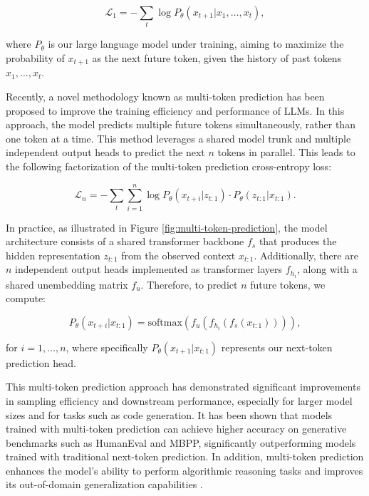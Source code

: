 \begin{equation}
    \mathcal{L}_1 = - \sum_{t} \log P_\theta (x_{t+1} | x_1, \ldots, x_t),
\end{equation}

where \( P_\theta \) is our large language model under training, aiming to maximize the probability of \( {x_{t+1}} \) as the next future token, given the history of past tokens \( {x_1, \ldots, x_t} \).

Recently, a novel methodology known as multi-token prediction has been proposed to improve the training efficiency and performance of LLMs. In this approach, the model predicts multiple future tokens simultaneously, rather than one token at a time. This method leverages a shared model trunk and multiple independent output heads to predict the next \( n \) tokens in parallel. This leads to the following factorization of the multi-token prediction cross-entropy
loss:

\begin{equation}
    \mathcal{L}_n = - \sum_{t} \sum_{i=1}^{n} \log P_\theta (x_{t+i} | z_{t:1}) \cdot P_\theta(z_{t:1} | x_{t:1}).
\end{equation}

In practice, as illustrated in Figure \ref{fig:multi-token-prediction}, the model architecture consists of a shared transformer backbone \( f_s \) that produces the hidden representation \( z_{t:1} \) from the observed context \( x_{t:1} \). Additionally, there are \( n \) independent output heads implemented as transformer layers \( f_{h_i} \), along with a shared unembedding matrix \( f_u \). Therefore, to predict \( n \) future tokens, we compute:

\begin{equation}
    P_\theta(x_{t+i} | x_{t:1}) = \text{softmax}(f_u(f_{h_i}(f_s(x_{t:1})))),
\end{equation}

for \( i = 1, \ldots, n \), where specifically \( P_\theta(x_{t+1} | x_{t:1}) \) represents our next-token prediction head.

This multi-token prediction approach has demonstrated significant improvements in sampling efficiency and downstream performance, especially for larger model sizes and for tasks such as code generation. It has been shown that models trained with multi-token prediction can achieve higher accuracy on generative benchmarks such as HumanEval and MBPP, significantly outperforming models trained with traditional next-token prediction. In addition, multi-token prediction enhances the model's ability to perform algorithmic reasoning tasks and improves its out-of-domain generalization capabilities \cite{gloeckle2024better}.

